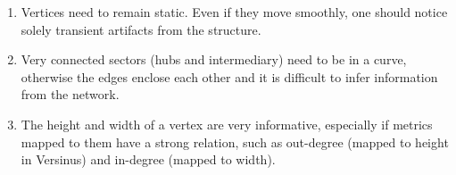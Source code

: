 																																																																																																																																																																																																																																																																																																																																																																																																				\begin{enumerate}
																																																																																																																																																																																																																																																																																																																																																																																																					\item Vertices need to remain static.
																																																																																																																																																																																																																																																																																																																																																																																																							Even if they move smoothly, one should notice solely transient artifacts from the structure.
																																																																																																																																																																																																																																																																																																																																																																																																								\item Very connected sectors (hubs and intermediary) need to be in a curve, otherwise the edges enclose each other and it is difficult to infer information from the network.
																																																																																																																																																																																																																																																																																																																																																																																																									\item The height and width of a vertex are very informative, especially if metrics mapped to them have a strong relation, such as out-degree (mapped to height in Versinus) and in-degree (mapped to width).

\end{enumerate}
